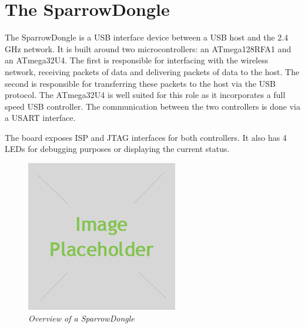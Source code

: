\section{The SparrowDongle}

The SparrowDongle is a USB interface device between a USB host and the 2.4 GHz
network. It is built around two microcontrollers: an ATmega128RFA1 and an
ATmega32U4. The first is responsible for interfacing with the wireless network,
receiving packets of data and delivering packets of data to the host. The 
second is responsible for transferring these packets to the host via the USB 
protocol. The ATmega32U4 is well suited for this role as it incorporates a full
speed USB controller. The communication between the two controllers is done via
a USART interface.

The board exposes ISP and JTAG interfaces for both controllers. It also has 4 
LEDs for debugging purposes or displaying the current status.

\begin{figure}[ht]
	\begin{center}
		\includegraphics{img/placeholder.jpg}
	\end{center}
	\caption{\small \itshape{Overview of a SparrowDongle}}
\end{figure}

